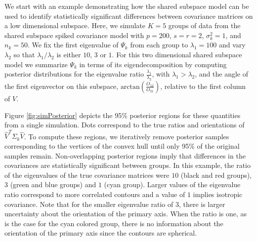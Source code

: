 \documentclass[12pt]{article}
\begin{document}

We start with an example demonstrating how the shared subspace
model can be used to identify statistically significant differences between
covariance matrices on a low dimensional subspace. Here, we simulate
$K=5$ groups of data from the shared subspace spiked covariance
model with $p=200$, $s=r=2$, $\sigma_k^2=1$, and
$n_k=50$.  We fix the first eigenvalue of $\Psi_k$ from each group to
$\lambda_1=100$ and vary $\lambda_2$ so that $\lambda_1/\lambda_2$ is
either $10$, $3$ or $1$.  For this two dimensional shared subspace
model we summarize $\Psi_k$ in terms of its eigendecomposition by
computing posterior distributions for the eigenvalue ratio
$\frac{\lambda_1}{\lambda_2}$, with $\lambda_1 > \lambda_2$, and the
angle of the first eigenvector on this subspace,
$\text{arctan}(\frac{O_{12}}{O_{21}})$, relative to the first column
of $V$.

Figure \ref{fig:simPosterior} depicts the 95\% posterior regions for
these quantities from a single simulation.  Dots correspond to the
true ratios and orientations of $\hat{V}^T\Sigma_k\hat{V}$. To compute
these regions, we iteratively remove posterior samples corresponding to the
vertices of the convex hull until only 95\% of the original samples
remain.  Non-overlapping posterior regions imply that differences in
the covariances are statistically significant between groups.  In this
example, the ratio of the eigenvalues of the true covariance matrices
were $10$ (black and red groups), $3$ (green and blue groups) and $1$
(cyan group).  Larger values of the eigenvalue ratio correspond to more
correlated contours and a value of $1$ implies isotropic covariance.
Note that for the smaller eigenvalue ratio of $3$, there is larger
uncertainty about the orientation of the primary axis.  When the ratio
is one, as is the case for the cyan colored group, there is no
information about the orientation of the primary axis since the contours
are spherical.
\end{document}
